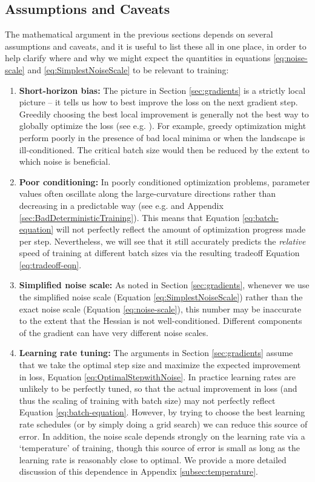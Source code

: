 \documentclass[english]{article}
\begin{document}
\subsection{Assumptions and Caveats}

The mathematical argument in the previous sections depends on several assumptions and caveats, and it is useful to list these all in one place, in order to help clarify where and why we might expect the quantities in equations \ref{eq:noise-scale} and \ref{eq:SimplestNoiseScale} to be relevant to training:
\begin{enumerate}
\item \textbf{Short-horizon bias:} The picture in Section \ref{sec:gradients} is a strictly local picture -- it tells us how to best improve the loss on the next gradient step. Greedily choosing the best local improvement is generally not the best way to globally optimize the loss (see e.g. \cite{1803.02021}). For example, greedy optimization might perform poorly in the presence of bad local minima or when the landscape is ill-conditioned.  The critical batch size would then be reduced by the extent to which noise is beneficial.
\item \textbf{Poor conditioning:} In poorly conditioned optimization problems, parameter values often oscillate along the large-curvature directions rather than decreasing in a predictable way (see e.g. \cite{goh2017why} and Appendix \ref{sec:BadDeterministicTraining}).  This means that Equation \ref{eq:batch-equation} will not perfectly reflect the amount of optimization progress made per step.  Nevertheless, we will see that it still accurately predicts the \emph{relative} speed of training at different batch sizes via the resulting tradeoff Equation \ref{eq:tradeoff-eqn}.
\item \textbf{Simplified noise scale:} As noted in Section \ref{sec:gradients}, whenever we use the simplified noise scale (Equation \ref{eq:SimplestNoiseScale}) rather than the exact noise scale (Equation \ref{eq:noise-scale}), this number may be inaccurate to the extent that the Hessian is not well-conditioned. Different components of the gradient can have very different noise scales.
\item \textbf{Learning rate tuning:} The arguments in Section \ref{sec:gradients} assume that we take the optimal step size and maximize the expected improvement in loss, Equation \ref{eq:OptimalStepwithNoise}. In practice learning rates are unlikely to be perfectly tuned, so that the actual improvement in loss (and thus the scaling of training with batch size) may not perfectly reflect Equation \ref{eq:batch-equation}.  However, by trying to choose the best learning rate schedules (or by simply doing a grid search) we can reduce this source of error.  In addition, the noise scale depends strongly on the learning rate via a `temperature' of training, though this source of error is small as long as the learning rate is reasonably close to optimal.  We provide a more detailed discussion of this dependence in Appendix \ref{subsec:temperature}.

\end{enumerate}
\end{document}
